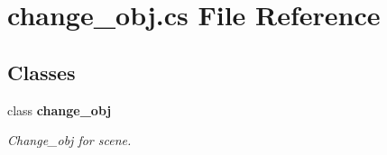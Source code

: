 \section{change\+\_\+obj.\+cs File Reference}
\label{change__obj_8cs}
\subsection*{Classes}
\begin{DoxyCompactItemize}
\item 
class {\bf change\+\_\+obj}
\begin{DoxyCompactList}\small\item\em Change\+\_\+obj for scene. \end{DoxyCompactList}\end{DoxyCompactItemize}
